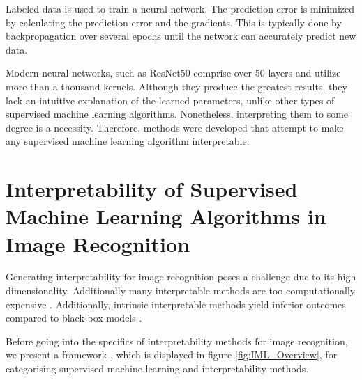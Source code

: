 Labeled data is used to train a neural network. The prediction error is minimized by calculating the prediction error and the gradients. This is typically done by backpropagation over several epochs until the network can accurately predict new data.

Modern neural networks, such as ResNet50 \cite{he2015deep} comprise over 50 layers and utilize more than a thousand kernels. Although they produce the greatest results, they lack an intuitive explanation of the learned parameters, unlike other types of supervised machine learning algorithms. Nonetheless, interpreting them to some degree is a necessity. Therefore, methods were developed that attempt to make any supervised machine learning algorithm interpretable. 

\chapter{Interpretability of Supervised Machine Learning Algorithms in Image Recognition}
\label{sec:IoNN}

Generating interpretability for image recognition poses a challenge due to its high dimensionality. Additionally many interpretable methods are too computationally expensive \cite{molnar2020}. Additionally, intrinsic interpretable methods yield inferior outcomes compared to black-box models \cite{delgado2014}.

Before going into the specifics of interpretability methods for image recognition, we present a framework \cite{allen2023interpretable}, which is displayed in figure \ref{fig:IML_Overview}, for categorising supervised machine learning and interpretability methods.

